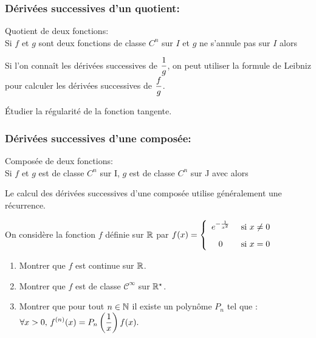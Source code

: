 \documentclass[a4paper, 11pt]{article}
\begin{document}
\subsubsection{D\'eriv\'ees successives d'un quotient:}

{\noindent

	\begin{prop} Quotient de deux fonctions:\\
		\noindent Si $f$ et $g$ sont deux fonctions de classe $C^n$ sur $I$ et $g$ ne s'annule pas sur $I$ alors \dotfill \vsec
	\end{prop}
}


\begin{rem}
	Si l'on conna\^it les d\'eriv\'ees successives de $\displaystyle \frac{1}{g}$, on peut utiliser la formule de Leibniz pour calculer les d\'eriv\'ees successives de $\displaystyle \frac{f}{g}$.
\end{rem}

{\footnotesize
\begin{exercice}
	\'Etudier la r\'egularit\'e de la fonction tangente.
\end{exercice}}\vsec\vsec\vsec


\subsubsection{D\'eriv\'ees successives d'une compos\'ee:}

{\noindent

	\begin{prop} Compos\'ee de deux fonctions:\\
		\noindent Si $f$ et $g$ est de classe $C^n$ sur I, $g$ est de classe $C^n$ sur J avec \dotfill  alors \dotfill \vsec
	\end{prop}
}

\begin{rem}
	Le calcul des d\'eriv\'ees successives d'une compos\'ee utilise g\'en\'eralement une r\'ecurrence.
\end{rem}

{\footnotesize
\begin{exercice}
	On consid\`ere la fonction $f$ d\'efinie sur $\mathbb{R}$ par $f(x) = \left\{ \begin{array}{cl}
			e^{-\frac{1}{x^2}} & \textmd{ si } x \not =0\vsec \\
			0                  & \textmd{ si } x=0
		\end{array}\right.$
	\begin{enumerate}
		\item Montrer que $f$ est continue sur $\mathbb{R}$.
		\item Montrer que $f$ est de classe $\mathcal{C}^{\infty}$ sur $\mathbb{R}^{\star}$.
		\item Montrer que pour tout $n\in\mathbb{N}$ il existe un polyn\^ome $P_n$ tel que : $ \forall x>0, \, \displaystyle f^{(n)}(x)=P_n\left(\frac{1}{x}\right) f(x).$
	\end{enumerate}
\end{exercice}}\vsec\vsec
\end{document}
